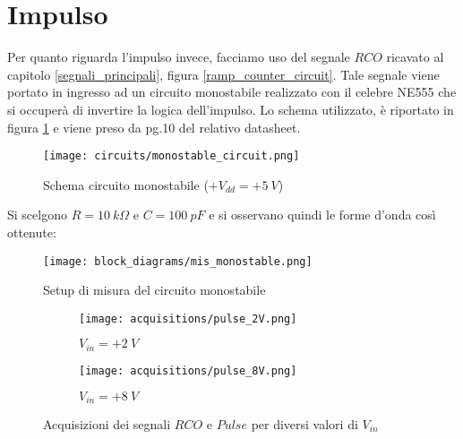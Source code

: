 
\section{Impulso}


Per quanto riguarda l'impulso invece, facciamo uso del segnale $RCO$ ricavato al capitolo
\ref{segnali_principali}, figura \ref{ramp_counter_circuit}. Tale segnale viene portato in
ingresso ad un circuito monostabile realizzato con il celebre NE555 \cite{ne555} che si
occuperà di invertire la logica dell'impulso. Lo schema utilizzato, è riportato in figura
\ref{monostable_circuit} e viene preso da pg.10 del relativo datasheet.

\begin{figure}[H]
    \centering
    \texttt{[image: circuits/monostable\_circuit.png]}
    \caption{Schema circuito monostabile ($+V_{dd}=+5\ V$)}
    \label{monostable_circuit}
\end{figure}

Si scelgono $R=10\ k\Omega$ e $C=100\ pF$ e si osservano quindi le forme d'onda così ottenute:

\begin{figure}[H]
    \centering
    \texttt{[image: block\_diagrams/mis\_monostable.png]}
    \caption{Setup di misura del circuito monostabile}
    \label{mis_monostable}
\end{figure}

\begin{figure}[H]
    \centering

    \begin{subfigure}{.5\textwidth}
        \centering
        \texttt{[image: acquisitions/pulse\_2V.png]}
        \caption{$V_{in}=+2\ V$}
        \label{acq_monostable_2V}
    \end{subfigure}%
    \begin{subfigure}{.5\textwidth}
        \centering
        \texttt{[image: acquisitions/pulse\_8V.png]}
        \caption{$V_{in}=+8\ V$}
        \label{acq_monostable_8V}
    \end{subfigure}

    \caption{Acquisizioni dei segnali $RCO$ e $Pulse$ per diversi valori di $V_{in}$}
    \label{mis_pulse}
\end{figure}

